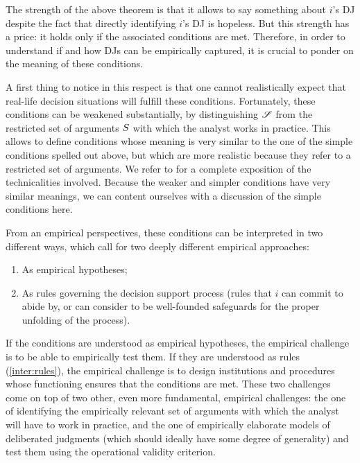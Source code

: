 \documentclass[version=3.21, pagesize, twoside=off, bibliography=totoc, DIV=calc, fontsize=12pt, a4paper, french, english]{scrartcl}
\begin{document}
The strength of the above theorem is that it allows to say something about $i$'s \ac{DJ} despite the fact that directly identifying $i$'s \ac{DJ} is hopeless. 
But this strength has a price: it holds only if the associated conditions are met. 
Therefore, in order to understand if and how \acp{DJ} can be empirically captured, it is crucial to ponder on the meaning of these conditions.

A first thing to notice in this respect is that one cannot realistically expect that real-life decision situations will fulfill these conditions. Fortunately, these conditions can be weakened substantially, by distinguishing $\mathscr{S}$ from the restricted set of arguments $S$ with which the analyst works in practice. This allows to define conditions whose meaning is very similar to the one of the simple conditions spelled out above, but which are more realistic because they refer to a restricted set of arguments. We refer to \citet{cailloux_formal_2018} for a complete exposition of the technicalities involved. Because the weaker and simpler conditions have very similar meanings, we can content ourselves with a discussion of the simple conditions here. 

From an empirical perspectives, these conditions can be interpreted in two different ways, which call for two deeply different empirical approaches:
\begin{enumerate}[label=\emph{\roman*}, ref=\emph{\roman*}]
		\item \label{inter:empir} As empirical hypotheses;
	\item \label{inter:rules} As rules governing the decision support process (rules that $i$ can commit to abide by, or can consider to be well-founded safeguards for the proper unfolding of the process).
\end{enumerate}

If the conditions are understood as empirical hypotheses, the empirical challenge is to be able to empirically test them. If they are understood as rules (\ref{inter:rules}), the empirical challenge is to design institutions and procedures whose functioning ensures that the conditions are met. These two challenges come on top of two other, even more fundamental, empirical challenges: the one of identifying the empirically relevant set of arguments with which the analyst will have to work in practice, and the one of empirically elaborate models of deliberated judgments (which should ideally have some degree of generality)  and test them using the operational validity criterion.
\end{document}
